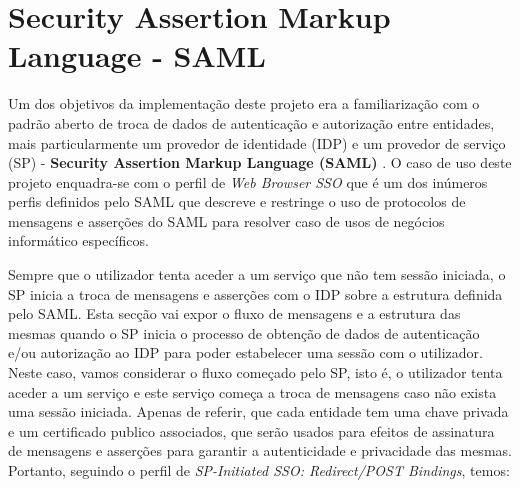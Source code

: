 \section{Security Assertion Markup Language - SAML}
\label{saml}
\quad Um dos objetivos da implementação deste projeto era a familiarização com o padrão aberto de troca de dados de autenticação e autorização entre entidades, mais particularmente um provedor de identidade (IDP) e um provedor de serviço (SP) - \textbf{Security Assertion Markup Language (SAML)} \cite{SAML}. O caso de uso deste projeto enquadra-se com o perfil de \textit{Web Browser SSO} que é um dos inúmeros perfis definidos pelo SAML que descreve e restringe o uso de protocolos de mensagens e asserções do SAML para resolver caso de usos de negócios informático específicos.

\quad Sempre que o utilizador tenta aceder a um serviço que não tem sessão iniciada, o SP inicia  a troca de mensagens e asserções com o IDP sobre a estrutura definida pelo SAML. Esta secção vai expor o fluxo de mensagens e a estrutura das mesmas quando o SP inicia o processo de obtenção de dados de autenticação e/ou autorização ao IDP para poder estabelecer uma sessão com o utilizador. Neste caso, vamos considerar o fluxo começado pelo SP, isto é, o utilizador tenta aceder a um serviço e este serviço começa a troca de mensagens caso não exista uma sessão iniciada. Apenas de referir, que cada entidade tem uma chave privada e um certificado publico associados, que serão usados para efeitos de assinatura de mensagens e asserções para garantir a autenticidade e privacidade das mesmas. Portanto, seguindo o perfil de \textit{SP-Initiated SSO: Redirect/POST Bindings}, temos:

